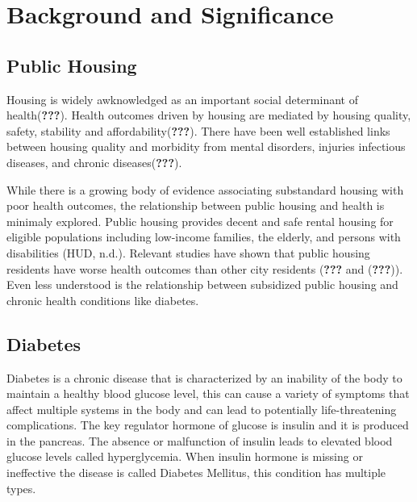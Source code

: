 \documentclass [11pt, proquest] {uwthesis}[2015/03/03]
\begin{document}
\titlepage
  \pagebreak


\copyrightpage

\setcounter{page}{-1}

\tableofcontents
\listoffigures
\listoftables



\textpages


\chapter{Background and Significance}\label{rmd-basics}

\section{Public Housing}\label{public-housing}

Housing is widely awknowledged as an important social determinant of
health({\textbf{???}}). Health outcomes driven by housing are mediated
by housing quality, safety, stability and affordability({\textbf{???}}).
There have been well established links between housing quality and
morbidity from mental disorders, injuries infectious diseases, and
chronic diseases({\textbf{???}}).

While there is a growing body of evidence associating substandard
housing with poor health outcomes, the relationship between public
housing and health is minimaly explored. Public housing provides decent
and safe rental housing for eligible populations including low-income
families, the elderly, and persons with disabilities (HUD, n.d.).
Relevant studies have shown that public housing residents have worse
health outcomes than other city residents ({\textbf{???}} and
({\textbf{???}})). Even less understood is the relationship between
subsidized public housing and chronic health conditions like diabetes.

\section{Diabetes}\label{diabetes}

Diabetes is a chronic disease that is characterized by an inability of
the body to maintain a healthy blood glucose level, this can cause a
variety of symptoms that affect multiple systems in the body and can
lead to potentially life-threatening complications. The key regulator
hormone of glucose is insulin and it is produced in the pancreas. The
absence or malfunction of insulin leads to elevated blood glucose levels
called hyperglycemia. When insulin hormone is missing or ineffective the
disease is called Diabetes Mellitus, this condition has multiple types.
\end{document}
